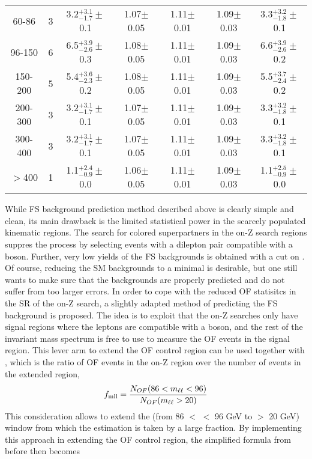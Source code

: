 \begin{table}[ht!]
\begin{tabular}{ c  c  c  c  c  c c}
60-86    & 3    & 3.2$^{+3.1}_{-1.7}\pm$0.1  &  1.07$\pm$0.05 & 1.11$\pm$0.01& 1.09$\pm$0.03 & 3.3$^{+3.2}_{-1.8}\pm$0.1 \\
96-150   & 6    & 6.5$^{+3.9}_{-2.6}\pm$0.3  &  1.08$\pm$0.05 & 1.11$\pm$0.01& 1.09$\pm$0.03 & 6.6$^{+3.9}_{-2.6}\pm$0.2 \\
150-200  & 5    & 5.4$^{+3.6}_{-2.3}\pm$0.2  &  1.08$\pm$0.05 & 1.11$\pm$0.01& 1.09$\pm$0.03 & 5.5$^{+3.7}_{-2.4}\pm$0.2 \\
200-300  & 3    & 3.2$^{+3.1}_{-1.7}\pm$0.1  &  1.07$\pm$0.05 & 1.11$\pm$0.01& 1.09$\pm$0.03 & 3.3$^{+3.2}_{-1.8}\pm$0.1 \\
300-400  & 3    & 3.2$^{+3.1}_{-1.7}\pm$0.1  &  1.07$\pm$0.05 & 1.11$\pm$0.01& 1.09$\pm$0.03 & 3.3$^{+3.2}_{-1.8}\pm$0.1 \\
$>$400   & 1    & 1.1$^{+2.4}_{-0.9}\pm$0.0  &  1.06$\pm$0.05 & 1.11$\pm$0.01& 1.09$\pm$0.03 & 1.1$^{+2.5}_{-0.9}\pm$0.0 \\
\hline\hline
\end{tabular}
\end{table}
While FS background prediction method described above is clearly simple and clean, its main drawback is the limited statistical power in the scarcely populated kinematic regions.
The search for colored superpartners in the on-Z search regions suppres the \ttbar process by selecting events with a dilepton pair compatible with a \PZ boson.
Further, very low yields of the FS backgrounds is obtained with a cut on \mttwo.
Of course, reducing the SM backgrounds to a minimal is desirable, but one still wants to make sure that the backgrounds are properly predicted and do not suffer from too larger errors.
In order to cope with the reduced OF statisitcs in the SR of the on-Z search, a slightly adapted method of predicting the FS background is proposed.
The idea is to exploit that the on-Z searches only have signal regions where the leptons are compatible with a \PZ boson, and the rest of the invariant mass spectrum is free to use to measure the OF events in the signal region.
This lever arm to extend the OF control region can be used together with \fmll, which is the ratio of OF events in the on-Z region over the number of events in the extended \mll region,
\begin{equation}
f_{\text{mll}}=\frac{N_{OF}(86<m_{\ell\ell}<96)}{N_{OF}(m_{\ell\ell}>20)}
\end{equation}
This consideration allows to extend the \mll (from 86 $<$ \mll $<$ 96 GeV to \mll $>$ 20 GeV) window from which the estimation is taken by a large fraction.
By implementing this approach in extending the OF control region, the simplified formula from before then becomes
